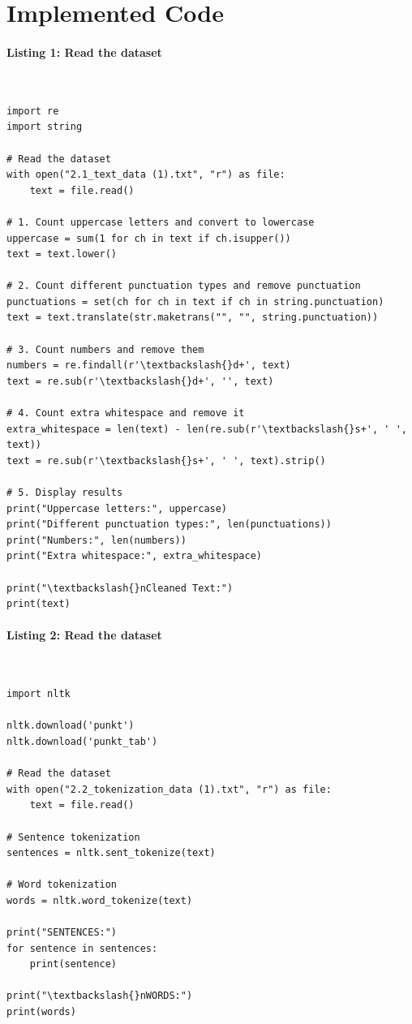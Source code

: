 \documentclass[12pt,a4paper,oneside]{report}
\begin{document}
\section{Implemented Code}
\paragraph{Listing 1: Read the dataset}\mbox{}\\[-1ex]
\begin{Verbatim}[commandchars=\\\{\},breaklines=true,breakanywhere=true,fontsize=\scriptsize,frame=leftline,framesep=2mm,rulecolor=\color{gray}]
import re
import string

# Read the dataset
with open("2.1_text_data (1).txt", "r") as file:
    text = file.read()

# 1. Count uppercase letters and convert to lowercase
uppercase = sum(1 for ch in text if ch.isupper())
text = text.lower()

# 2. Count different punctuation types and remove punctuation
punctuations = set(ch for ch in text if ch in string.punctuation)
text = text.translate(str.maketrans("", "", string.punctuation))

# 3. Count numbers and remove them
numbers = re.findall(r'\textbackslash{}d+', text)
text = re.sub(r'\textbackslash{}d+', '', text)

# 4. Count extra whitespace and remove it
extra_whitespace = len(text) - len(re.sub(r'\textbackslash{}s+', ' ', text))
text = re.sub(r'\textbackslash{}s+', ' ', text).strip()

# 5. Display results
print("Uppercase letters:", uppercase)
print("Different punctuation types:", len(punctuations))
print("Numbers:", len(numbers))
print("Extra whitespace:", extra_whitespace)

print("\textbackslash{}nCleaned Text:")
print(text)
\end{Verbatim}
\paragraph{Listing 2: Read the dataset}\mbox{}\\[-1ex]
\begin{Verbatim}[commandchars=\\\{\},breaklines=true,breakanywhere=true,fontsize=\scriptsize,frame=leftline,framesep=2mm,rulecolor=\color{gray}]
import nltk

nltk.download('punkt')
nltk.download('punkt_tab')

# Read the dataset
with open("2.2_tokenization_data (1).txt", "r") as file:
    text = file.read()

# Sentence tokenization
sentences = nltk.sent_tokenize(text)

# Word tokenization
words = nltk.word_tokenize(text)

print("SENTENCES:")
for sentence in sentences:
    print(sentence)

print("\textbackslash{}nWORDS:")
print(words)
\end{Verbatim}
\end{document}
